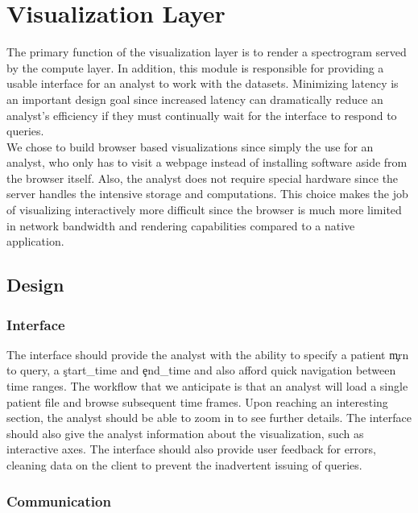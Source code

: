\chapter{Visualization Layer}\label{viz-ch}

The primary function of the visualization layer is to render a spectrogram
served by the compute layer. In addition, this module is responsible for
providing a usable interface for an analyst to work with the datasets.
Minimizing latency is an important design goal since increased latency can
dramatically reduce an analyst's efficiency if they must continually wait for
the interface to respond to queries. \\

We chose to build browser based visualizations since simply the use for
an analyst, who only has to visit a webpage instead of installing software
aside from the browser itself. Also, the analyst does not require special
hardware since the server handles the intensive storage and computations.  This
choice makes the job of visualizing interactively more difficult since the
browser is much more limited in network bandwidth and rendering capabilities
compared to a native application.

\section{Design}

\subsection{Interface}

The interface should provide the analyst with the ability to specify a patient
\c{mrn} to query, a \c{start\_time} and \c{end\_time} and also afford quick
navigation between time ranges. The workflow that we anticipate is that an
analyst will load a single patient file and browse subsequent time frames. Upon
reaching an interesting section, the analyst should be able to zoom in to see
further details. The interface should also give the analyst information about
the visualization, such as interactive axes. The interface should also provide
user feedback for errors, cleaning data on the client to prevent the
inadvertent issuing of queries.

\subsection{Communication}

